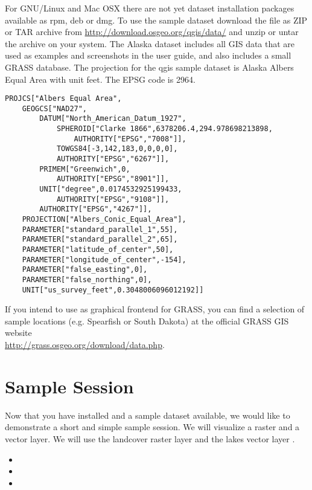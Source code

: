 \nix \osx For GNU/Linux and Mac OSX there are not yet dataset installation
packages available as rpm, deb or dmg. To use the sample dataset download the
file  as ZIP or TAR archive from
\url{http://download.osgeo.org/qgis/data/} and unzip or untar the archive on
your system. The Alaska dataset includes all GIS data that are used as
examples and screenshots in the user guide, and also includes a small GRASS
database. The projection for the qgis sample dataset is Alaska Albers Equal
Area with unit feet. The EPSG code is 2964.

\begin{verbatim}
PROJCS["Albers Equal Area",
    GEOGCS["NAD27",
        DATUM["North_American_Datum_1927",
            SPHEROID["Clarke 1866",6378206.4,294.978698213898,
                AUTHORITY["EPSG","7008"]],
            TOWGS84[-3,142,183,0,0,0,0],
            AUTHORITY["EPSG","6267"]],
        PRIMEM["Greenwich",0,
            AUTHORITY["EPSG","8901"]],
        UNIT["degree",0.0174532925199433,
            AUTHORITY["EPSG","9108"]],
        AUTHORITY["EPSG","4267"]],
    PROJECTION["Albers_Conic_Equal_Area"],
    PARAMETER["standard_parallel_1",55],
    PARAMETER["standard_parallel_2",65],
    PARAMETER["latitude_of_center",50],
    PARAMETER["longitude_of_center",-154],
    PARAMETER["false_easting",0],
    PARAMETER["false_northing",0],
    UNIT["us_survey_feet",0.3048006096012192]]
\end{verbatim}

If you intend to use \qg as graphical frontend for GRASS, you can find a
selection of sample locations (e.g. Spearfish or South Dakota) at the
official GRASS GIS website \\
\url{http://grass.osgeo.org/download/data.php}. 

\section{Sample Session}\label{samplesession}

Now that you have \qg installed and a sample dataset available, we would 
like to demonstrate a short and simple \qg sample session. We will visualize 
a raster and a vector layer. We will use the landcover raster 
layer  and the lakes 
vector layer .


\begin{itemize}[label=--]
\item {}
\item {}
\item {}
\end{itemize} 

